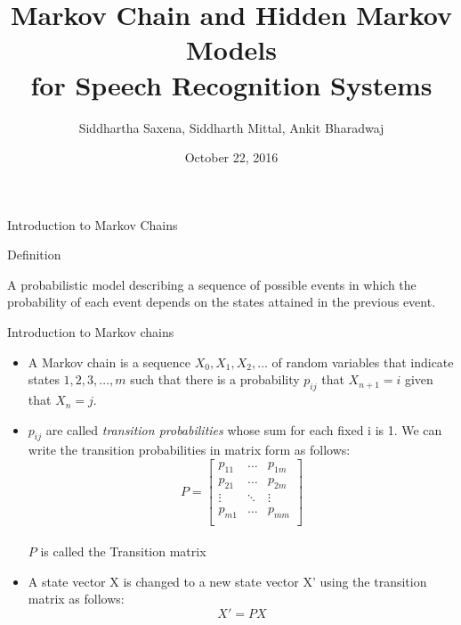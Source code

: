 \documentclass[compress]{beamer}
\title[Markov Chain and Hidden Markov Models]{Markov Chain and Hidden Markov Models\\ for Speech Recognition Systems}
\author[]{Siddhartha Saxena, Siddharth Mittal, Ankit Bharadwaj}
\institute[] %
{
  
  Department of Computer Science and Engineering\\
  Indian Institute of Technology, Kanpur
}
\date{October 22, 2016}
\begin{document}
\frame{\titlepage}

\section{}
\subsection{}
\begin{frame}{Introduction to Markov Chains}
  \begin{block}{Definition}
  \item {
    A probabilistic model describing a sequence of possible events in which the probability of each event depends on the states attained in the previous event.
  }
  \end{block}
\end{frame}

\begin{frame}{Introduction to Markov chains}
    \begin{itemize}
        \item {
            A Markov chain is a sequence \(X_0, X_1, X_2, \ldots\) of random variables that indicate states \(1, 2, 3, \ldots, m\) such that there is a probability \(p_{ij}\) that \(X_{n+1} = i\) given that \(X_n = j\).
        }
        \pause \item{
            \(p_{ij}\) are called \textit{transition probabilities} whose sum for each fixed i is 1. We can write the transition probabilities in matrix form as follows:
            \\
            \[ P=
                \begin{bmatrix}
                p_{11} & \ldots & p_{1m} \\
                p_{21} & \ldots & p_{2m}\\
                \vdots & \ddots & \vdots\\
                p_{m1} & \ldots & p_{mm}\\
                \end{bmatrix}
            \]
            \\ \(P\) is called the Transition matrix
        }
        \pause \item{
        	A state vector X is changed to a new state vector X' using the transition matrix as follows:
        	\[X'=PX\]
        	}
    \end{itemize}
\end{frame}
\end{document}
